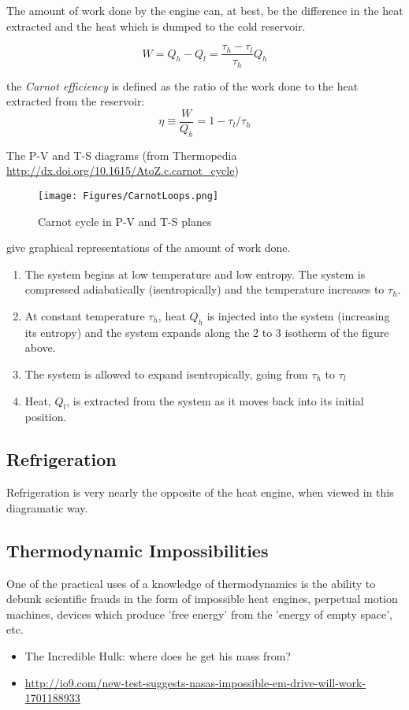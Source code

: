 The amount of work done by the engine can, at best, be the difference in the heat extracted and the heat which is dumped to the cold reservoir.

\begin{equation}
W = Q_h - Q_l = \frac{\tau_h - \tau_l}{\tau_h} Q_h
\end{equation}

the \textit{Carnot efficiency} is defined as the ratio of the work done to the heat extracted from the reservoir:
\begin{equation}
\eta \equiv \frac{W}{Q_h} = 1 - \tau_l/\tau_h
\end{equation}

The P-V and T-S diagrams (from Thermopedia \url{http://dx.doi.org/10.1615/AtoZ.c.carnot_cycle})
\begin{figure}[h]
\centering
\texttt{[image: Figures/CarnotLoops.png]}
\caption{Carnot cycle in P-V and T-S planes}
\end{figure}
give graphical representations of the amount of work done.

\begin{enumerate}
\item The system begins at low temperature and low entropy. The system is compressed 
adiabatically (isentropically) and the temperature increases to $\tau_h$.

\item At constant temperature $\tau_h$, heat $Q_h$ is injected into the system (increasing its entropy)
and the system expands along the 2 to 3 isotherm of the figure above.

\item The system is allowed to expand isentropically, going from $\tau_h$ to $\tau_l$

\item Heat, $Q_l$, is extracted from the system as it moves back into its initial position.

\end{enumerate}


\subsection{Refrigeration}
Refrigeration is very nearly the opposite of the heat engine, when viewed in this diagramatic way.


\subsection{Thermodynamic Impossibilities}
One of the practical uses of a knowledge of thermodynamics is the ability to debunk scientific frauds in the form of impossible heat engines, perpetual motion machines, devices which produce 'free energy' from the 'energy of empty space', etc.

\begin{itemize}
\item The Incredible Hulk: where does he get his mass from?

\item \url{http://io9.com/new-test-suggests-nasas-impossible-em-drive-will-work-1701188933}


\end{itemize}
